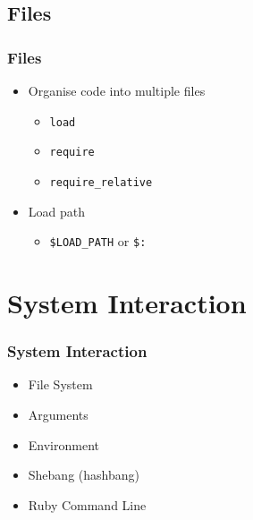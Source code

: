 \subsection{Files}
\begin{frame}[fragile]\frametitle{Files}

\begin{itemize}

\item Organise code into multiple files

\begin{itemize}
\item \texttt{load}
\item \texttt{require}
\item \texttt{require\_relative}
\end{itemize}

\end{itemize}

\pause

\begin{itemize}

\item Load path

\begin{itemize}
\item \texttt{\$LOAD\_PATH} or \texttt{\$:}
\end{itemize}

\end{itemize}


\end{frame}




\section{System Interaction} 
\begin{frame}\frametitle{System Interaction} 
\begin{itemize}
\item File System
\item Arguments
\item Environment
\item Shebang (hashbang)
\item Ruby Command Line
\end{itemize}
\end{frame}






